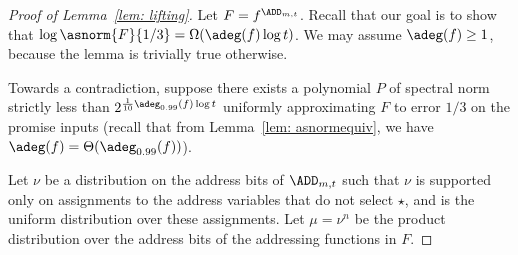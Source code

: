 \begin{proof}[Proof of Lemma~\ref{lem: lifting}]

Let $F = f^{\ADD_{m, t}}$. Recall that our goal is to show that $\log \asnorm{F}{1/3} = \Omega(\adeg(f) \log t)$. We may assume $\adeg(f) \geq 1$, because the lemma is trivially true otherwise.  

Towards a contradiction, suppose there exists a polynomial $P$ of spectral norm strictly less than $2^{\frac{1}{10}\adeg_{0.99}(f)\log t}$ uniformly approximating $F$ to error $1/3$ on the promise inputs (recall that from Lemma~\ref{lem: asnormequiv}, we have $\adeg(f) = \Theta(\adeg_{0.99}(f))$).

Let $\nu$ be a distribution on the address bits of $\ADD_{m, t}$ such that $\nu$ is supported only on assignments to the address variables that do not select $\star$, and is the uniform distribution over these assignments.
Let $\mu = \nu^n$ be the product distribution over the address bits of the addressing functions in $F$.


\end{proof}
